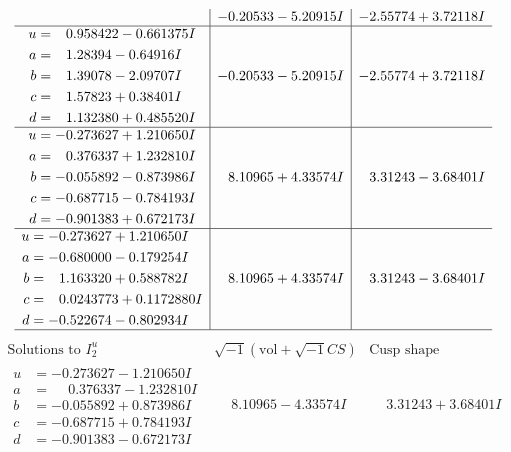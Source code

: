 \documentclass[1p]{elsarticle_modified}
\theoremstyle{definition}
\newcommand{\I}{\sqrt{-1}}
\begin{document}
$$\begin{array}{c|c|c}
 & -0.20533 - 5.20915 I & -2.55774 + 3.72118 I \\ \hline\begin{aligned}
u &= \phantom{-}0.958422 - 0.661375 I \\
a &= \phantom{-}1.28394 - 0.64916 I \\
b &= \phantom{-}1.39078 - 2.09707 I \\
c &= \phantom{-}1.57823 + 0.38401 I \\
d &= \phantom{-}1.132380 + 0.485520 I\end{aligned}
 & -0.20533 - 5.20915 I & -2.55774 + 3.72118 I \\ \hline\begin{aligned}
u &= -0.273627 + 1.210650 I \\
a &= \phantom{-}0.376337 + 1.232810 I \\
b &= -0.055892 - 0.873986 I \\
c &= -0.687715 - 0.784193 I \\
d &= -0.901383 + 0.672173 I\end{aligned}
 & \phantom{-}8.10965 + 4.33574 I & \phantom{-}3.31243 - 3.68401 I \\ \hline\begin{aligned}
u &= -0.273627 + 1.210650 I \\
a &= -0.680000 - 0.179254 I \\
b &= \phantom{-}1.163320 + 0.588782 I \\
c &= \phantom{-}0.0243773 + 0.1172880 I \\
d &= -0.522674 - 0.802934 I\end{aligned}
 & \phantom{-}8.10965 + 4.33574 I & \phantom{-}3.31243 - 3.68401 I\\
 \hline 
 \end{array}$$\newpage$$\begin{array}{c|c|c}  
\text{Solutions to }I^u_{2}& \I (\text{vol} + \sqrt{-1}CS) & \text{Cusp shape}\\
 \hline 
\begin{aligned}
u &= -0.273627 - 1.210650 I \\
a &= \phantom{-}0.376337 - 1.232810 I \\
b &= -0.055892 + 0.873986 I \\
c &= -0.687715 + 0.784193 I \\
d &= -0.901383 - 0.672173 I\end{aligned}
 & \phantom{-}8.10965 - 4.33574 I & \phantom{-}3.31243 + 3.68401 I \\ \hline\begin{aligned}

\end{aligned}
\end{array}$$
\end{document}
